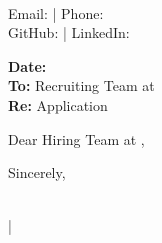 \documentclass[11pt, letterpaper]{article}
\begin{document}
\begin{center}
    \textbf{\LARGE {}} \\
    \vspace{2mm}
    Email:  | Phone:  \\
    GitHub:  | LinkedIn: 
\end{center}

\vspace{5mm}

\textbf{Date:}  \\
\textbf{To:} Recruiting Team at  \\
\textbf{Re:}  Application

\vspace{5mm}

Dear Hiring Team at ,


\vspace{8mm}

Sincerely,

\vspace{4mm}

\textbf{} \\
 | 
\end{document}
